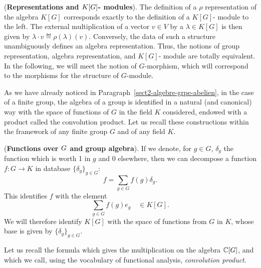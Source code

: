 \begin{rem}{(\upshape \textbf{Representations and $ K[G]$- modules}).}
\label{rmk-representations-modules}
 The definition of a $ \rho $ representation of the algebra $ K[G] $ corresponds exactly to the definition of a $ K[G]$- module to the left. The external multiplication of a vector $ v \in V $ by a  $ \lambda \in K[G] $ is then given by $ \lambda \cdot v \eqdef \rho (\lambda) (v ) $. Conversely, the data of such a structure unambiguously defines an algebra representation. Thus, the notions of group representation, algebra representation, and $ K[G]$- module are totally equivalent. In the following, we will meet the notion of $G$-morphism, which will correspond to the morphisms for the structure of $G$-module. 
\end{rem}
As we have already noticed in Paragraph~\ref{sect2-algebre-grpe-abelien}, in the case of a finite group, the algebra of a group is identified in a natural (and canonical) way with the space of functions of $G$ in the field $K$ considered, endowed with a product called the convolution product. Let us recall these constructions within the framework of any finite group $G$ and of any field $K$.
 
\begin{rem}{(\upshape \textbf{Functions over $ G $ and group algebra}).}
 If we denote, for $ g \in G $, $ \delta_g $ the function which is worth 1 in $ g $ and 0 elsewhere, then we can decompose a function $ f: G \rightarrow K $ in database $ \{\delta_g\}_{g \in G} $:
\begin{equation}
\label{eq-decomposition-function-f}
f = \sum_{g \in G}{f(g) \delta_g}.
\end{equation}
This identifies $ f $ with the element
\begin{equation*}
\sum_{g \in G}{f(g) e_g} \quad \in K[G].
\end{equation*}
We will therefore identify $ K[G] $ with the space of functions from $G$ in $K$, whose base is given by $ \{\delta_g\}_{g \in G} $.
\end{rem}
Let us recall the formula which gives the multiplication on the algebra $ \mathbb{C} [G] $, and which we call, using the vocabulary of functional analysis, \textit{convolution product}.
 

